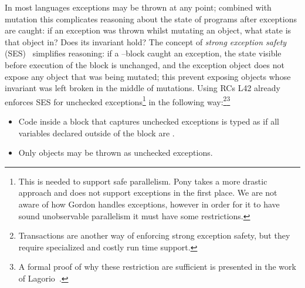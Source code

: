 {}\label{s:exceptions}
In most languages exceptions may be thrown at any point; combined with mutation this complicates reasoning about the state of programs after exceptions are caught: if an exception was thrown whilst mutating an object, what state is that object in? Does its invariant hold?
The concept of \emph{strong exception safety} (SES)~\cite{Abrahams2000,JOT:issue_2011_01/article1} simplifies reasoning:
if a \Q@try@--\Q@catch@ block caught an exception, the state visible before execution of the \Q@try@ block is unchanged, and the exception object does not expose any object that was being mutated; this prevent exposing objects whose invariant was left broken in the middle of mutations.
Using RCs L42 already enforces SES for unchecked exceptions\footnote{%
This is needed to support safe parallelism. Pony takes a more drastic approach and does not support exceptions in the first place. 
We are not aware of how Gordon \etal handles exceptions, however in order for it to have sound unobservable parallelism it must have some restrictions.%
}
in the following way:\footnote{Transactions are another way of enforcing strong exception safety, but they require specialized and costly run time support.}\footnote{A formal proof of why these restriction are sufficient is presented in the work of Lagorio~\cite{JOT:issue_2011_01/article1}.}
\begin{itemize}
\item Code inside a \Q@try@ block that captures unchecked exceptions is typed as if all \Q@mut@ variables declared outside of the block are \Q@read@.
\item Only \Q@imm@ objects may be thrown as unchecked exceptions.
\end{itemize} 
